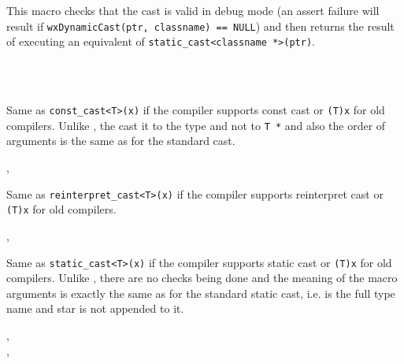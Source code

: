 
This macro checks that the cast is valid in debug mode (an assert failure will
result if {\tt wxDynamicCast(ptr, classname) == NULL}) and then returns the
result of executing an equivalent of {\tt static\_cast<classname *>(ptr)}.


\\
\\


\label{wxconstcastraw}


Same as \texttt{const\_cast<T>(x)} if the compiler supports const cast or
\texttt{(T)x} for old compilers. Unlike ,
the cast it to the type  and not to \texttt{T *} and also the order of
arguments is the same as for the standard cast.


,\\


\label{wxreinterpretcastraw}


Same as \texttt{reinterpret\_cast<T>(x)} if the compiler supports reinterpret cast or
\texttt{(T)x} for old compilers.


,\\


\label{wxstaticcastraw}


Same as \texttt{static\_cast<T>(x)} if the compiler supports static cast or
\texttt{(T)x} for old compilers. Unlike ,
there are no checks being done and the meaning of the macro arguments is exactly
the same as for the standard static cast, i.e.  is the full type name and
star is not appended to it.


,\\
,\\


